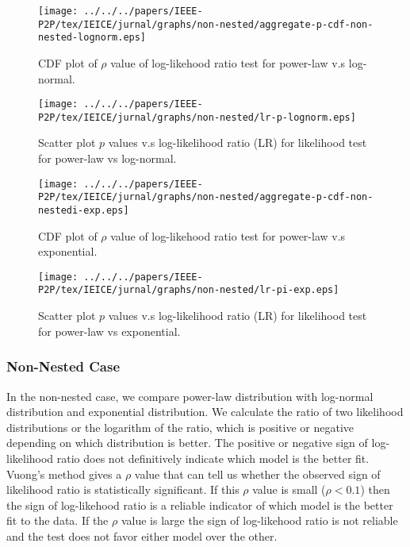 \begin{figure}[!tb]
\begin{center}
\texttt{[image: ../../../papers/IEEE-P2P/tex/IEICE/jurnal/graphs/non-nested/aggregate-p-cdf-non-nested-lognorm.eps]}
\end{center}
\caption{CDF plot of $\rho$ value of log-likehood ratio test for power-law v.s 
         log-normal.} %
\label{fig:cdf-p-lognorm}
\end{figure}

\begin{figure}[!tb]
\begin{center}
\texttt{[image: ../../../papers/IEEE-P2P/tex/IEICE/jurnal/graphs/non-nested/lr-p-lognorm.eps]}
\end{center}
\caption{Scatter plot $p$ values v.s log-likelihood
         ratio (LR) for likelihood test for power-law vs log-normal.} 
\label{fig:scatter-lognorm}
\end{figure}

\begin{figure}[!tb]
\begin{center}
\texttt{[image: ../../../papers/IEEE-P2P/tex/IEICE/jurnal/graphs/non-nested/aggregate-p-cdf-non-nestedi-exp.eps]}
\end{center}
\caption{CDF plot of $\rho$ value of log-likehood ratio test for power-law v.s exponential.} 
\label{fig:cdf-p-exp}
\end{figure}

\begin{figure}[!tb]
\begin{center}
\texttt{[image: ../../../papers/IEEE-P2P/tex/IEICE/jurnal/graphs/non-nested/lr-pi-exp.eps]}
\end{center}
\caption{Scatter plot $p$ values v.s log-likelihood 
         ratio (LR) for likelihood test for power-law vs exponential.} 
\label{fig:scatter-exp}
\end{figure}

\subsubsection{Non-Nested Case}
In the non-nested case, we compare power-law distribution with log-normal distribution and exponential distribution.
We calculate the ratio of two likelihood distributions or the logarithm of the ratio, which is positive or negative depending on which distribution is better.
The positive or negative sign of log-likelihood ratio does not definitively indicate which model is the better fit. 
Vuong's \cite{vuong1989likelihood}  method gives a $\rho$ value that can tell us whether the observed sign of likelihood ratio is statistically significant.
If this $\rho$ value is small ($\rho < 0.1$) then the sign of log-likehood ratio is a reliable indicator of which model is the better fit to the data. 
If the $\rho$ value is large the sign of log-likehood ratio is not reliable and the test does not favor either model over the other. 

